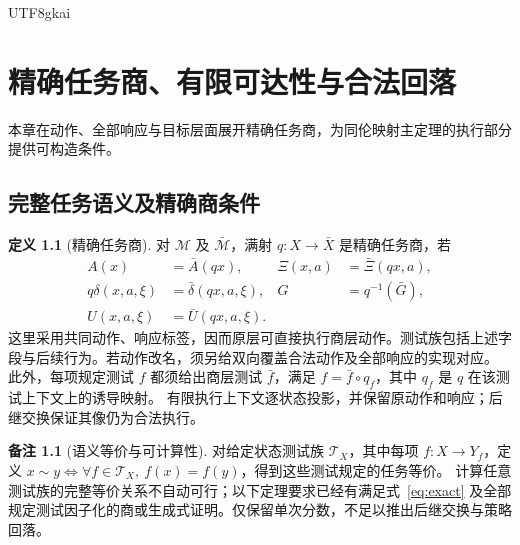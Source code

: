 \documentclass[12pt]{report}
\theoremstyle{definition}
\newtheorem{definition}{定义}[chapter]
\newtheorem{remark}{备注}[chapter]
\begin{document}
\begin{CJK*}{UTF8}{gkai}
\chapter{精确任务商、有限可达性与合法回落}
\label{sec:quotient}
本章在动作、全部响应与目标层面展开精确任务商，为同伦映射主定理的执行部分提供可构造条件。
\section{完整任务语义及精确商条件}
\begin{definition}[精确任务商]
对 \(\mathcal M\) 及 \(\bar{\mathcal M}\)，满射 \(q:X\to\bar X\) 是精确任务商，若
\begin{equation}\label{eq:exact}
\begin{aligned}
A(x)&=\bar A(qx),&\Xi(x,a)&=\bar\Xi(qx,a),\\
q\delta(x,a,\xi)&=\bar\delta(qx,a,\xi),&G&=q^{-1}(\bar G),\\
U(x,a,\xi)&=\bar U(qx,a,\xi).
\end{aligned}
\end{equation}
这里采用共同动作、响应标签，因而原层可直接执行商层动作。测试族包括上述字段与后续行为。若动作改名，须另给双向覆盖合法动作及全部响应的实现对应。
此外，每项规定测试 \(f\) 都须给出商层测试 \(\bar f\)，满足
\(f=\bar f\circ q_f\)，其中 \(q_f\) 是 \(q\) 在该测试上下文上的诱导映射。
有限执行上下文逐状态投影，并保留原动作和响应；后继交换保证其像仍为合法执行。
\end{definition}
\begin{remark}[语义等价与可计算性]
对给定状态测试族 \(\mathcal T_X\)，其中每项 \(f:X\to Y_f\)，定义
\(x\sim y\iff\forall f\in\mathcal T_X,\ f(x)=f(y)\)，得到这些测试规定的任务等价。
计算任意测试族的完整等价关系不自动可行；以下定理要求已经有满足式~\eqref{eq:exact}
及全部规定测试因子化的商或生成式证明。仅保留单次分数，不足以推出后继交换与策略回落。
\end{remark}


\end{CJK*}
\end{document}
